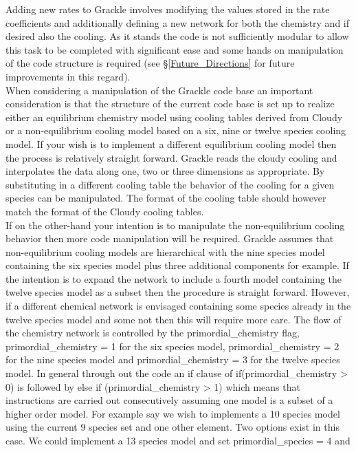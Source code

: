 Adding new rates to Grackle involves modifying the values stored in the rate coefficients and 
additionally defining a new network for both the chemistry and if desired also the cooling. As it stands the
code is not sufficiently modular to allow this task to be completed with significant ease and some
hands on manipulation of the code structure is required (see \S \ref{Future_Directions} for 
future improvements in this regard). \\
\indent When considering a manipulation of the Grackle code base an important consideration is that the structure
of the current code base is set up to realize either an equilibrium chemistry model using cooling tables
derived from Cloudy or a non-equilibrium cooling model based on a six, nine or twelve species cooling model. 
If your wish is to implement a different equilibrium cooling model then the process is relatively straight
forward. Grackle reads the cloudy cooling and interpolates the data along one, two or three dimensions as
appropriate. By substituting in a different cooling table the behavior of the cooling for a given species
can be manipulated. The format of the cooling table should however match the format of the Cloudy cooling
tables. \\
\indent If on the other-hand your intention is to manipulate the non-equilibrium cooling behavior then more
code manipulation will be required. Grackle assumes that non-equilibrium cooling models are hierarchical
with the nine species model containing the six species model plus three additional components for example. 
If the intention is to expand the network to include a fourth model containing the twelve species model as 
a subset then the procedure is straight forward. However, if a different chemical network is envisaged 
containing some species already in the twelve species model and some not then this will require more care. 
The flow of the chemistry network is controlled by the primordial\_chemistry flag, 
primordial\_chemistry = 1 for the six species model, primordial\_chemistry = 2 for the nine species model and
primordial\_chemistry = 3 for the twelve species model. In general through out the code an if clause of 
if(primordial\_chemistry > 0) is followed by else if (primordial\_chemistry > 1) which means that instructions
are carried out consecutively assuming one model is a subset of a higher order model.
For example say we wish to implements a 10 species model using the current 9 species set and one other element. 
Two options exist in this case. We could implement a 13 species model and set primordial\_species = 4 and 
